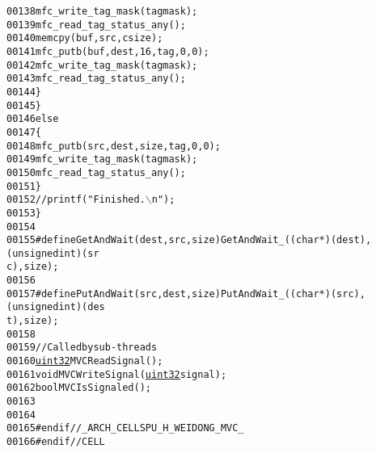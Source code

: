 \begin{footnotesize}
\begin{alltt}
00138                         mfc\_write\_tag\_mask(tagmask);
00139                         mfc\_read\_tag\_status\_any();
00140                         memcpy(buf, src, csize);
00141                         mfc\_putb(buf, dest, 16, tag, 0, 0);
00142                         mfc\_write\_tag\_mask(tagmask);
00143                         mfc\_read\_tag\_status\_any();
00144                 \}
00145         \}
00146         \textcolor{keywordflow}{else}
00147         \{
00148                 mfc\_putb(src, dest, size, tag, 0, 0);
00149                 mfc\_write\_tag\_mask(tagmask);
00150                 mfc\_read\_tag\_status\_any();
00151         \}
00152         \textcolor{comment}{//      printf("Finished.\(\backslash\)n");}
00153 \}
00154 
00155 \textcolor{preprocessor}{#define GetAndWait(dest, src, size) GetAndWait\_((char *)(dest), (unsigned int)(sr
      c), size);}
00156 \textcolor{preprocessor}{}
00157 \textcolor{preprocessor}{#define PutAndWait(src, dest, size) PutAndWait\_((char *)(src), (unsigned int)(des
      t), size);}
00158 \textcolor{preprocessor}{}
00159 \textcolor{comment}{// Called by sub-threads}
00160 \hyperlink{_types_8h_a1134b580f8da4de94ca6b1de4d37975e}{uint32} MVCReadSignal();
00161 \textcolor{keywordtype}{void} MVCWriteSignal(\hyperlink{_types_8h_a1134b580f8da4de94ca6b1de4d37975e}{uint32} signal);
00162 \textcolor{keywordtype}{bool} MVCIsSignaled();
00163 
00164 
00165 \textcolor{preprocessor}{#endif //\_ARCH\_CELLSPU\_H\_WEIDONG\_MVC\_}
00166 \textcolor{preprocessor}{}\textcolor{preprocessor}{#endif //CELL}
\end{alltt}\end{footnotesize}
